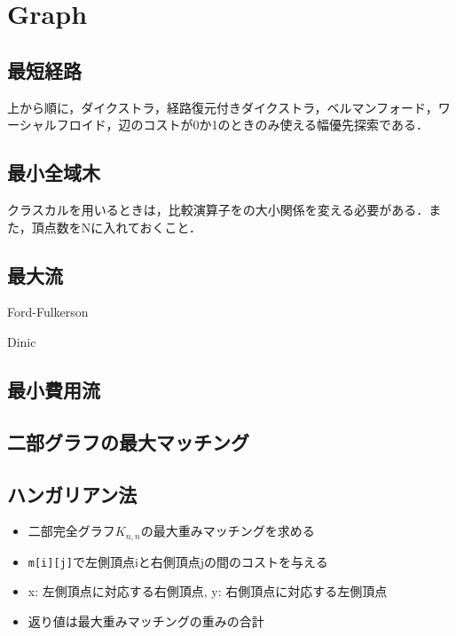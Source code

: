 \section{Graph}

\subsection{最短経路}
上から順に，ダイクストラ，経路復元付きダイクストラ，ベルマンフォード，ワーシャルフロイド，辺のコストが0か1のときのみ使える幅優先探索である．


\subsection{最小全域木}
クラスカルを用いるときは，比較演算子をの大小関係を変える必要がある．また，頂点数をNに入れておくこと．


\subsection{最大流}
Ford-Fulkerson

Dinic


\subsection{最小費用流}


\subsection{二部グラフの最大マッチング}



\subsection{ハンガリアン法}
\begin{itemize}
  \item 二部完全グラフ$K_{n,n}$の最大重みマッチングを求める
  \item \verb#m[i][j]#で左側頂点iと右側頂点jの間のコストを与える
  \item x: 左側頂点に対応する右側頂点, y: 右側頂点に対応する左側頂点
  \item 返り値は最大重みマッチングの重みの合計
\end{itemize}


